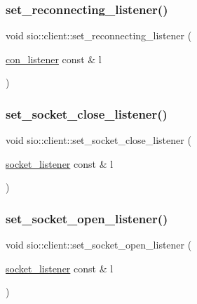 \subsubsection{\texorpdfstring{set\+\_\+reconnecting\+\_\+listener()}{set\_reconnecting\_listener()}}
{\footnotesize\ttfamily void sio\+::client\+::set\+\_\+reconnecting\+\_\+listener (\begin{DoxyParamCaption}\item[{\hyperlink{classsio_1_1client_a23951b626c91c87e866d4e966ec828fa}{con\+\_\+listener} const \&}]{l }\end{DoxyParamCaption})}

\mbox{\label{classsio_1_1client_ac95e53ccbde50dee8f314a26caf41bd3}} 
\subsubsection{\texorpdfstring{set\+\_\+socket\+\_\+close\+\_\+listener()}{set\_socket\_close\_listener()}}
{\footnotesize\ttfamily void sio\+::client\+::set\+\_\+socket\+\_\+close\+\_\+listener (\begin{DoxyParamCaption}\item[{\hyperlink{classsio_1_1client_a02b43cadd1588575ae2465042452cabf}{socket\+\_\+listener} const \&}]{l }\end{DoxyParamCaption})}

\mbox{\label{classsio_1_1client_a49821e44c763e2b96def29bf4d2d00ad}} 
\subsubsection{\texorpdfstring{set\+\_\+socket\+\_\+open\+\_\+listener()}{set\_socket\_open\_listener()}}
{\footnotesize\ttfamily void sio\+::client\+::set\+\_\+socket\+\_\+open\+\_\+listener (\begin{DoxyParamCaption}\item[{\hyperlink{classsio_1_1client_a02b43cadd1588575ae2465042452cabf}{socket\+\_\+listener} const \&}]{l }\end{DoxyParamCaption})}

